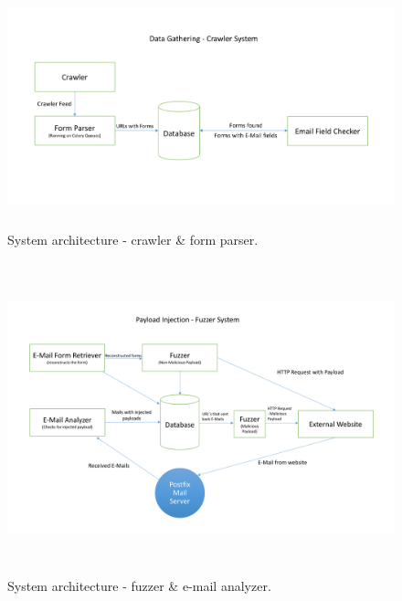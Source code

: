 \begin{figure}
	\centering
	\includegraphics[width=14cm, height=7cm]{System/crawler_design}
	\caption[]{System architecture - crawler \& form parser.}
	\label{fig:crawler}
\end{figure}


\begin{figure}
	\centering
	\includegraphics[width=16cm, height=9cm]{System/fuzzer_design}
	\caption[]{System architecture - fuzzer {\&} e-mail analyzer.}
	\label{fig:fuzzer}
\end{figure}
